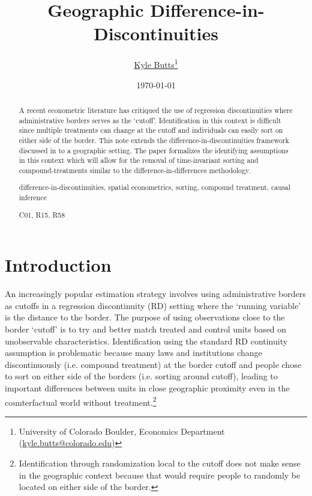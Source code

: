 \documentclass[12pt]{article}
\title{\color{navyblue} Geographic Difference-in-Discontinuities}
\author{\href{https://kylebutts.com/}{Kyle Butts}\thanks{University of Colorado Boulder, Economics Department (\href{mailto:kyle.butts@colorado.edu}{kyle.butts@colorado.edu})}}
\date{\footnotesize\today}
\begin{document}
\begin{titlepage}
    \maketitle
    
    \begin{abstract}
        {\small
        A recent econometric literature has critiqued the use of regression discontinuities where administrative borders serves as the `cutoff'. Identification in this context is difficult since multiple treatments can change at the cutoff and individuals can easily sort on either side of the border. This note extends the difference-in-discontinuities framework discussed in \citet{Grembi_Nannicini_Troiano_2016} to a geographic setting. The paper formalizes the identifying assumptions in this context which will allow for the removal of time-invariant sorting and compound-treatments similar to the difference-in-differences methodology.
    
        \par
         difference-in-discontinuities, spatial econometrics, sorting, compound treatment, causal inference
        \par
         C01, R15, R58
        \par
        }
    \end{abstract}
\end{titlepage}

\section{Introduction}

An increasingly popular estimation strategy involves using administrative borders as cutoffs in a regression discontinuity (RD) setting where the `running variable' is the distance to the border. The purpose of using observations close to the border `cutoff' is to try and better match treated and control units based on unobservable characteristics. Identification using the standard RD continuity assumption is problematic because many laws and institutions change discontinuously (i.e. compound treatment) at the border cutoff and people chose to sort on either side of the borders (i.e. sorting around cutoff), leading to important differences between units in close geographic proximity even in the counterfactual world without treatment.\footnote{Identification through randomization local to the cutoff does not make sense in the geographic context because that would require people to randomly be located on either side of the border.} 
\end{document}
